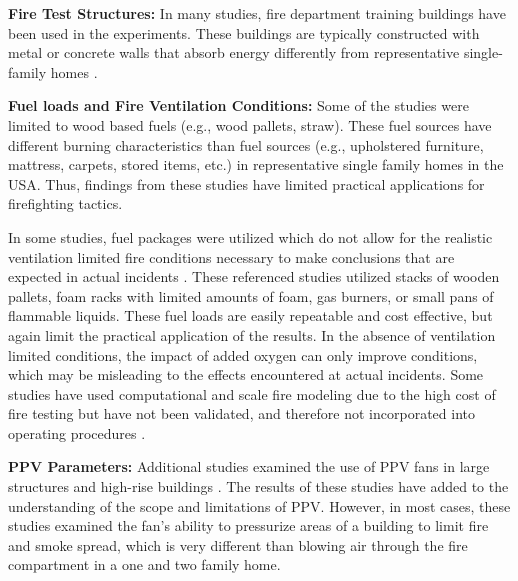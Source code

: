 \documentclass{article}
\begin{document}
\textbf{Fire Test Structures:} In many studies, fire department training buildings have been used in the experiments. These buildings are typically constructed with metal or concrete walls that absorb energy differently from representative single-family homes \cite{HughesPPVTesting} \cite{KerberPPVinTraining} \cite{SvennsonFireVentilationDuringOperatoins}. 

\textbf{Fuel loads and Fire Ventilation Conditions:} Some of the studies were limited to wood based fuels (e.g., wood pallets, straw). These fuel sources have different burning characteristics than fuel sources (e.g., upholstered furniture, mattress, carpets, stored items, etc.) in representative single family homes in the USA. Thus, findings from these studies \cite{HughesPPVTesting} \cite{KerberPPVinTraining} \cite{SvennsonFireVentilationDuringOperatoins} have limited practical applications for firefighting tactics. \par

In some studies, fuel packages were utilized which do not allow for the realistic ventilation limited fire conditions necessary to make conclusions that are expected in actual incidents \cite{ExekoyePPVHouseFires} \cite{SvenssonFireVentinLargeFireHall} \cite{BowserTacticalVent} \cite{EzekoyePPVStrucuresReport}. These referenced studies utilized stacks of wooden pallets, foam racks with limited amounts of foam, gas burners, or small pans of flammable liquids. These fuel loads are easily repeatable and cost effective, but again limit the practical application of the results. In the absence of ventilation limited conditions, the impact of added oxygen can only improve conditions, which may be misleading to the effects encountered at actual incidents. Some studies have used computational and scale fire modeling due to the high cost of fire testing but have not been validated, and therefore not incorporated into operating procedures \cite{Didona1993modeling} \cite{KerberPPVCFD} \cite{KerberPPVFDS} \cite{TuomisaariVentilationInFirefighting}. \par

\textbf{PPV Parameters:} \mbox{}Additional studies examined the use of PPV fans in large structures and high-rise buildings \cite{SymposiumHighRisePPV} \cite{KerberMadrzyPPVInLargeStructures} \cite{KerberMadrzyPPVInHighRise}. The results of these studies have added to the understanding of the scope and limitations of PPV. However, in most cases, these studies examined the fan’s ability to pressurize areas of a building to limit fire and smoke spread, which is very different than blowing air through the fire compartment in a one and two family home. 
\end{document}
